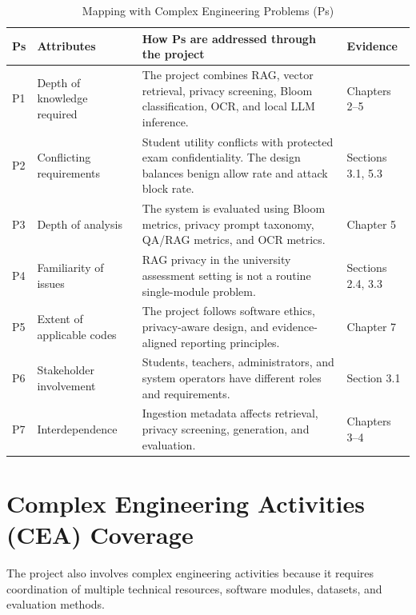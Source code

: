 \begin{table}[H]
\centering
\caption{Mapping with Complex Engineering Problems (Ps)}
\label{tab:cep_mapping}
\begin{tabular}{|p{}|p{}|p{}|p{}|}
\hline
\textbf{Ps} & \textbf{Attributes} & \textbf{How Ps are addressed through the project} & \textbf{Evidence}\\
\hline
P1 & Depth of knowledge required & The project combines RAG, vector retrieval, privacy screening, Bloom classification, OCR, and local LLM inference. & Chapters 2--5\\
\hline
P2 & Conflicting requirements & Student utility conflicts with protected exam confidentiality. The design balances benign allow rate and attack block rate. & Sections 3.1, 5.3\\
\hline
P3 & Depth of analysis & The system is evaluated using Bloom metrics, privacy prompt taxonomy, QA/RAG metrics, and OCR metrics. & Chapter 5\\
\hline
P4 & Familiarity of issues & RAG privacy in the university assessment setting is not a routine single-module problem. & Sections 2.4, 3.3\\
\hline
P5 & Extent of applicable codes & The project follows software ethics, privacy-aware design, and evidence-aligned reporting principles. & Chapter 7\\
\hline
P6 & Stakeholder involvement & Students, teachers, administrators, and system operators have different roles and requirements. & Section 3.1\\
\hline
P7 & Interdependence & Ingestion metadata affects retrieval, privacy screening, generation, and evaluation. & Chapters 3--4\\
\hline
\end{tabular}
\end{table}

\section{Complex Engineering Activities (CEA) Coverage}

The project also involves complex engineering activities because it requires coordination of multiple technical resources, software modules, datasets, and evaluation methods.

